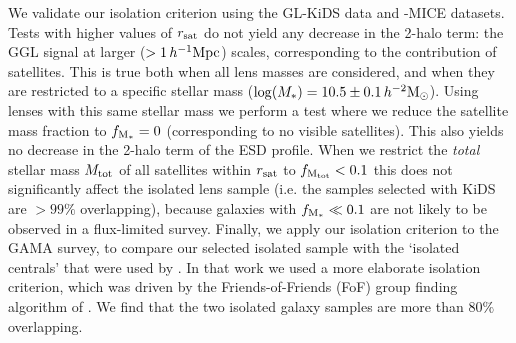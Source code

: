 \documentclass[usenatbib]{mnras}
\newcommand{\hmsun}{\,h^{-2} {\rm M_\odot}}
\newcommand{\hMpc}{\, h^{-1}{\rm{Mpc}} }
\newcommand{\un}[1]{_{\rm #1}}
\begin{document}
We validate our isolation criterion using the GL-KiDS data and -MICE datasets. Tests with higher values of $r\un{sat}$ do not yield any decrease in the 2-halo term: the GGL signal at larger ($>1\hMpc$) scales, corresponding to the contribution of satellites. This is true both when all lens masses are considered, and when they are restricted to a specific stellar mass ($\log(M_*)=10.5\pm0.1\hmsun$). Using lenses with this same stellar mass we perform a test where we reduce the satellite mass fraction to $f\un{M_*}=0$ (corresponding to no visible satellites). This also yields no decrease in the 2-halo term of the ESD profile. When we restrict the \emph{total} stellar mass $M\un{tot}$ of all satellites within $r\un{sat}$ to $f\un{M\un{tot}}<0.1$ this does not significantly affect the isolated lens sample (i.e. the samples selected with KiDS are $>99\%$ overlapping), because galaxies with $f\un{M_*}\ll0.1$ are not likely to be observed in a flux-limited survey. Finally, we apply our isolation criterion to the GAMA survey, to compare our selected isolated sample with the `isolated centrals' that were used by \cite{brouwer2017}. In that work we used a more elaborate isolation criterion, which was driven by the Friends-of-Friends (FoF) group finding algorithm of \cite{robotham2011lenscat}. We find that the two isolated galaxy samples are more than $80\%$ overlapping.
\end{document}
